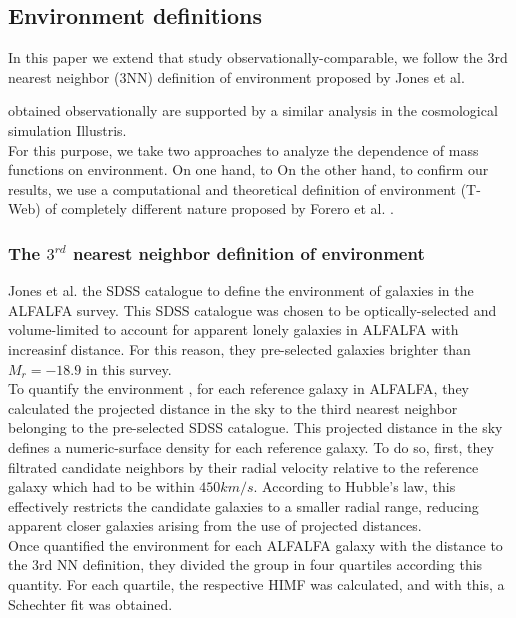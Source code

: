 \documentclass[a4paper,fleqn,usenatbib]{mnras}
\begin{document}
 

\subsection{Environment definitions}



In this paper we extend that 
study observationally-comparable, we follow the 3rd nearest neighbor
(3NN) definition of environment proposed by Jones et
al. 


obtained observationally are supported by a similar analysis in the
cosmological simulation Illustris.\\  

For this purpose, we take two approaches to analyze the dependence of mass functions on environment. 
On one hand, to On the other hand, to confirm our results, we use a computational and theoretical definition of environment (T-Web) of completely different nature proposed by Forero et al. \cite{Forero2009}. 

\subsubsection{The $3^{rd}$ nearest neighbor definition of environment}

Jones et al. \cite{Jones2016} the SDSS \cite{SDSS2011} catalogue to define the environment of galaxies in the ALFALFA \cite{ALFALFA} survey.
This SDSS catalogue was chosen to be optically-selected and volume-limited to account for apparent lonely galaxies in ALFALFA with increasinf distance. 
For this reason, they pre-selected galaxies brighter than $M_r = -18.9$ in this survey.\\

To quantify the environment , for each reference galaxy in ALFALFA, they calculated the projected distance in the sky to the third nearest neighbor belonging to the pre-selected SDSS catalogue.
This projected distance in the sky defines a numeric-surface density for each reference galaxy.
To do so, first, they filtrated candidate neighbors by their radial velocity relative to the reference galaxy which had to be within $450km/s$.
According to Hubble's law, this effectively restricts the candidate galaxies to a smaller radial range, reducing apparent closer galaxies arising from the use of projected distances. \\

Once quantified the environment for each ALFALFA galaxy with the distance to the 3rd NN definition, they divided the group in four quartiles according this quantity. 
For each quartile, the respective HIMF was calculated, and with this, a Schechter fit was obtained. 
 
\end{document}
